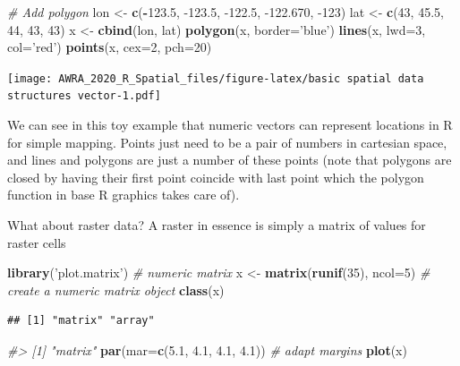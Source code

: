 \documentclass[
]{book}
\newenvironment{Shaded}{\begin{snugshade}}{\end{snugshade}}
\newcommand{\CommentTok}[1]{\textcolor[rgb]{0.56,0.35,0.01}{\textit{#1}}}
\newcommand{\DataTypeTok}[1]{\textcolor[rgb]{0.13,0.29,0.53}{#1}}
\newcommand{\DecValTok}[1]{\textcolor[rgb]{0.00,0.00,0.81}{#1}}
\newcommand{\FloatTok}[1]{\textcolor[rgb]{0.00,0.00,0.81}{#1}}
\newcommand{\KeywordTok}[1]{\textcolor[rgb]{0.13,0.29,0.53}{\textbf{#1}}}
\newcommand{\NormalTok}[1]{#1}
\newcommand{\OperatorTok}[1]{\textcolor[rgb]{0.81,0.36,0.00}{\textbf{#1}}}
\newcommand{\StringTok}[1]{\textcolor[rgb]{0.31,0.60,0.02}{#1}}
\begin{document}
\begin{Shaded}
\begin{Highlighting}[]
\CommentTok{# Add polygon}
\NormalTok{lon <-}\StringTok{ }\KeywordTok{c}\NormalTok{(}\OperatorTok{-}\FloatTok{123.5}\NormalTok{, }\FloatTok{-123.5}\NormalTok{, }\FloatTok{-122.5}\NormalTok{, }\FloatTok{-122.670}\NormalTok{, }\DecValTok{-123}\NormalTok{)}
\NormalTok{lat <-}\StringTok{ }\KeywordTok{c}\NormalTok{(}\DecValTok{43}\NormalTok{, }\FloatTok{45.5}\NormalTok{, }\DecValTok{44}\NormalTok{, }\DecValTok{43}\NormalTok{, }\DecValTok{43}\NormalTok{)}
\NormalTok{x <-}\StringTok{ }\KeywordTok{cbind}\NormalTok{(lon, lat)}
\KeywordTok{polygon}\NormalTok{(x, }\DataTypeTok{border=}\StringTok{'blue'}\NormalTok{)}
\KeywordTok{lines}\NormalTok{(x, }\DataTypeTok{lwd=}\DecValTok{3}\NormalTok{, }\DataTypeTok{col=}\StringTok{'red'}\NormalTok{)}
\KeywordTok{points}\NormalTok{(x, }\DataTypeTok{cex=}\DecValTok{2}\NormalTok{, }\DataTypeTok{pch=}\DecValTok{20}\NormalTok{)}
\end{Highlighting}
\end{Shaded}

\texttt{[image: AWRA\_2020\_R\_Spatial\_files/figure-latex/basic spatial data structures vector-1.pdf]}

We can see in this toy example that numeric vectors can represent locations in R for simple mapping. Points just need to be a pair of numbers in cartesian space, and lines and polygons are just a number of these points (note that polygons are closed by having their first point coincide with last point which the polygon function in base R graphics takes care of).

What about raster data? A raster in essence is simply a matrix of values for raster cells

\begin{Shaded}
\begin{Highlighting}[]
\KeywordTok{library}\NormalTok{(}\StringTok{'plot.matrix'}\NormalTok{)}
\CommentTok{# numeric matrix}
\NormalTok{x <-}\StringTok{ }\KeywordTok{matrix}\NormalTok{(}\KeywordTok{runif}\NormalTok{(}\DecValTok{35}\NormalTok{), }\DataTypeTok{ncol=}\DecValTok{5}\NormalTok{) }\CommentTok{# create a numeric matrix object}
\KeywordTok{class}\NormalTok{(x)}
\end{Highlighting}
\end{Shaded}

\begin{verbatim}
## [1] "matrix" "array"
\end{verbatim}

\begin{Shaded}
\begin{Highlighting}[]
\CommentTok{#> [1] "matrix"}
\KeywordTok{par}\NormalTok{(}\DataTypeTok{mar=}\KeywordTok{c}\NormalTok{(}\FloatTok{5.1}\NormalTok{, }\FloatTok{4.1}\NormalTok{, }\FloatTok{4.1}\NormalTok{, }\FloatTok{4.1}\NormalTok{)) }\CommentTok{# adapt margins}
\KeywordTok{plot}\NormalTok{(x)}
\end{Highlighting}
\end{Shaded}
\end{document}
